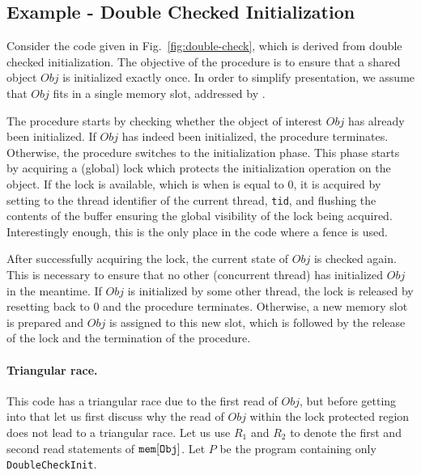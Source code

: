 \documentclass[preprint,9pt]{sigplanconf}
\begin{document}
\subsection{Example - Double Checked Initialization}
\label{subsec:example-double-check}
Consider the code given in Fig.~\ref{fig:double-check}, which is derived from double checked initialization.
The objective of the procedure is to ensure that a shared object $Obj$ is initialized exactly once.
In order to simplify presentation, we assume that $Obj$ fits in a single memory slot, addressed by {}.

The procedure starts by checking whether the object of interest $Obj$ has already been initialized.
If $Obj$ has indeed been initialized, the procedure terminates.
Otherwise, the procedure switches to the initialization phase.
This phase starts by acquiring a (global) lock which protects the initialization operation on the object.
If the lock is available, which is when {} is equal to 0, it is acquired by setting {} to the thread identifier of the current thread, {\tt tid}, and flushing the contents of the buffer ensuring the global visibility of the lock being acquired.
Interestingly enough, this is the only place in the code where a fence is used.

After successfully acquiring the lock, the current state of $Obj$ is checked again.
This is necessary to ensure that no other (concurrent thread) has initialized $Obj$ in the meantime.
If $Obj$ is initialized by some other thread, the lock is released by resetting {} back to 0 and the procedure terminates.
Otherwise, a new memory slot is prepared and $Obj$ is assigned to this new slot, which is followed by the release of the lock and the termination of the procedure.

\paragraph{Triangular race.}
This code has a triangular race due to the first read of $Obj$, but before getting into that let us first discuss why the read of $Obj$ within the lock protected region does not lead to a triangular race.
Let us use $R_1$ and $R_2$ to denote the first and second read statements of $\mathtt{mem}[\tt Obj]$. 
Let $P$ be the program containing only {\tt DoubleCheckInit}.
\end{document}

